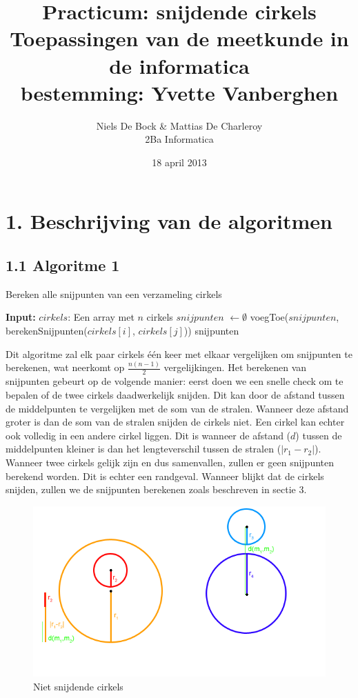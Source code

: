 \documentclass[11pt,a4paper]{report}
\author{Niels De Bock \& Mattias De Charleroy \\ 2Ba Informatica}
\date{18 april 2013}
\title{\Huge Practicum: snijdende cirkels \\ \LARGE Toepassingen van de meetkunde in de informatica\\ \normalsize bestemming: Yvette Vanberghen}
\begin{document}
\maketitle
\newpage

\section*{1. Beschrijving van de algoritmen}
\subsection*{1.1 Algoritme 1}


\begin{algorithm}
\caption{Bereken alle snijpunten van een verzameling cirkels}
\begin{algorithmic}
	\STATE \textbf{Input:}  $cirkels$: Een array met $n$ cirkels
	\STATE $snijpunten$ $\gets \emptyset$
            \STATE  voegToe($snijpunten$, berekenSnijpunten($cirkels[i]$, $cirkels[j]$))
        \ENDFOR
    \ENDFOR
    \RETURN snijpunten
\end{algorithmic}
\end{algorithm}

Dit algoritme zal elk paar cirkels \'e\'en keer met elkaar vergelijken om snijpunten te berekenen, wat neerkomt op $\frac{n(n-1)}{2}$ vergelijkingen. Het berekenen van snijpunten gebeurt op de volgende manier: eerst doen we een snelle check om te bepalen of de twee cirkels daadwerkelijk snijden. Dit kan door de afstand tussen de middelpunten te vergelijken met de som van de stralen. Wanneer deze afstand groter is dan de som van de stralen snijden de cirkels niet. Een cirkel kan echter ook volledig in een andere cirkel liggen. Dit is wanneer de afstand ($d$) tussen de middelpunten kleiner is dan het lengteverschil tussen de stralen ($|r_1-r_2|$). Wanneer twee cirkels gelijk zijn en dus samenvallen, zullen er geen snijpunten berekend worden. Dit is echter een randgeval. Wanneer blijkt dat de cirkels snijden, zullen we de snijpunten berekenen zoals beschreven in sectie 3.

\begin{figure}[h]
\includegraphics[scale=0.9]{2cirkels.png}
\caption{Niet snijdende cirkels}
\label{fig1}
\end{figure}
\end{document}
